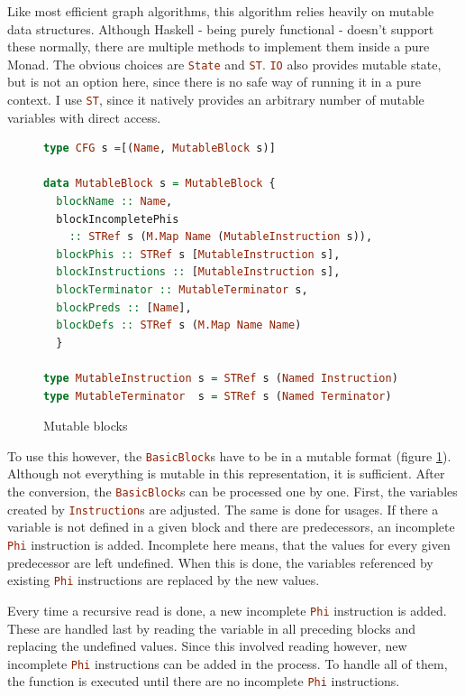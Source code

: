 \documentclass[a4paper,bibliography=totocnumbered,parskip,headsepline]{scrbook}
\begin{document}
Like most efficient graph algorithms, this algorithm relies heavily on mutable data structures.
Although Haskell - being purely functional - doesn't support these normally, there are multiple methods to implement them inside a pure Monad.
The obvious choices are \lstinline[language=haskell]!State! and \lstinline[language=haskell]!ST!.
\lstinline[language=haskell]!IO! also provides mutable state, but is not an option here, since there is no safe way of running it in a pure context.
I use \lstinline[language=haskell]!ST!, since it natively provides an arbitrary number of mutable variables with direct access.

\begin{figure}
\begin{lstlisting}[language=haskell]
type CFG s =[(Name, MutableBlock s)]

data MutableBlock s = MutableBlock {
  blockName :: Name,
  blockIncompletePhis
    :: STRef s (M.Map Name (MutableInstruction s)),
  blockPhis :: STRef s [MutableInstruction s],
  blockInstructions :: [MutableInstruction s],
  blockTerminator :: MutableTerminator s,
  blockPreds :: [Name],
  blockDefs :: STRef s (M.Map Name Name)
  }

type MutableInstruction s = STRef s (Named Instruction)
type MutableTerminator  s = STRef s (Named Terminator)
\end{lstlisting}
\caption{Mutable blocks}
\label{fig:blockmut}
\end{figure}

To use this however, the \lstinline[language=haskell]!BasicBlock!s have to be in a mutable format (figure \ref{fig:blockmut}).
Although not everything is mutable in this representation, it is sufficient.
After the conversion, the \lstinline[language=haskell]!BasicBlock!s can be processed one by one.
First, the variables created by \lstinline[language=haskell]!Instruction!s are adjusted.
The same is done for usages.
If there a variable is not defined in a given block and there are predecessors, an incomplete \lstinline[language=haskell]!Phi! instruction is added.
Incomplete here means, that the values for every given predecessor are left undefined.
When this is done, the variables referenced by existing \lstinline[language=haskell]!Phi! instructions are replaced by the new values.

Every time a recursive read is done, a new incomplete \lstinline[language=haskell]!Phi! instruction is added.
These are handled last by reading the variable in all preceding blocks and replacing the undefined values.
Since this involved reading however, new incomplete \lstinline[language=haskell]!Phi! instructions can be added in the process.
To handle all of them, the function is executed until there are no incomplete \lstinline[language=haskell]!Phi! instructions.
\end{document}
